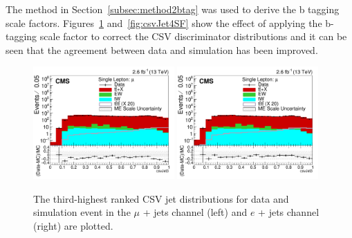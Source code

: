 The method in Section~\ref{subsec:method2btag} was used to derive the b tagging scale factors. Figures~\ref{fig:csvJet3SF} and~\ref{fig:csvJet4SF} show the effect of applying the b-tagging scale factor to correct the CSV discriminator distributions and it can be seen that the agreement between data and simulation has been improved.

\begin{figure}[ht!]
    \includegraphics[width=0.48\textwidth]{images/Run2/csvJet3_StackLogY_noSF.pdf}
    \includegraphics[width=0.48\textwidth]{images/Run2/csvJet3_StackLogY.pdf}
    \caption{ The third-highest ranked CSV jet distributions for data and simulation event in the $\mu$ + jets channel (left) and $e$ + jets channel (right) are plotted.}
    \label{fig:csvJet3SF}
\end{figure}
